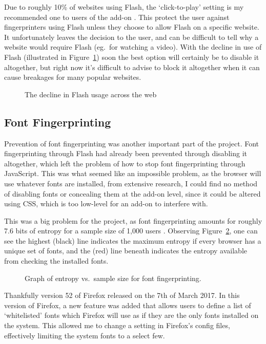 Due to roughly 10\% of websites using Flash, the `click-to-play' setting is my recommended one to users of the add-on \citep{flash-usage}.
This protect the user against fingerprinters using Flash unless they choose to allow Flash on a specific website.
It unfortunately leaves the decision to the user, and can be difficult to tell why a website would require Flash (eg.\ for watching a video).
With the decline in use of Flash (illustrated in Figure~\ref{fig:flash-usage}) soon the best option will certainly be to disable it altogether, but right now it's difficult to advise to block it altogether when it can cause breakages for many popular websites.

\begin{figure}[h!]
\caption{The decline in Flash usage across the web}
\centering
\label{fig:flash-usage}
\end{figure}

\subsection{Font Fingerprinting}

Prevention of font fingerprinting was another important part of the project.
Font fingerprinting through Flash had already been prevented through disabling it altogether, which left the problem of how to stop font fingerprinting through JavaScript.
This was what seemed like an impossible problem, as the browser will use whatever fonts are installed, from extensive research, I could find no method of disabling fonts or concealing them at the add-on level, since it could be altered using CSS, which is too low-level for an add-on to interfere with.

This was a big problem for the project, as font fingerprinting amounts for roughly 7.6 bits of entropy for a sample size of 1,000 users \citep{font-metrics}.
Observing Figure~\ref{fig:font-metrics}, one can see the highest (black) line indicates the maximum entropy if every browser has a unique set of fonts, and the (red) line beneath indicates the entropy available from checking the installed fonts.

\begin{figure}[h!]
\caption{Graph of entropy vs.\ sample size for font fingerprinting.}
\centering
\label{fig:font-metrics}
\end{figure}

Thankfully version 52 of Firefox released on the 7th of March 2017.
In this version of Firefox, a new feature was added that allows users to define a list of `whitelisted' fonts which Firefox will use as if they are the only fonts installed on the system.
This allowed me to change a setting in Firefox's config files, effectively limiting the system fonts to a select few.

